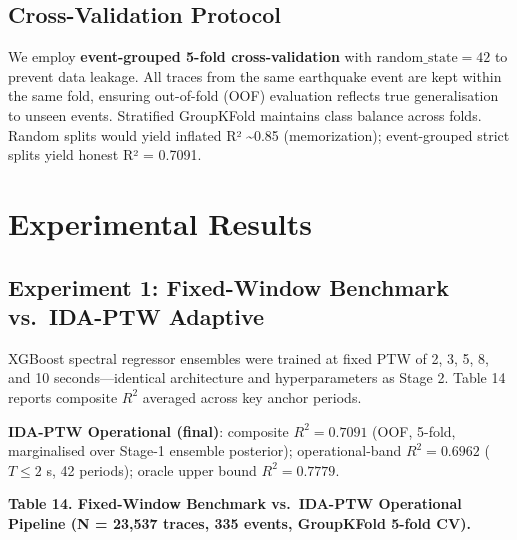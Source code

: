 \documentclass[10pt]{article}
\begin{document}
\subsection{Cross-Validation Protocol}

We employ \textbf{event-grouped 5-fold cross-validation} with $\mathrm{random\_state} = 42$ to prevent data leakage. All traces from the same earthquake event are kept within the same fold, ensuring out-of-fold (OOF) evaluation reflects true generalisation to unseen events. Stratified GroupKFold maintains class balance across folds. Random splits would yield inflated R² \textasciitilde0.85 (memorization); event-grouped strict splits yield honest R² = 0.7091.

\section{Experimental Results}

\subsection{Experiment 1: Fixed-Window Benchmark vs.~IDA-PTW Adaptive}

XGBoost spectral regressor ensembles were trained at fixed PTW of 2, 3, 5, 8, and 10 seconds---identical architecture and hyperparameters as Stage 2. Table 14 reports composite \(R^2\) averaged across key anchor periods.

\textbf{IDA-PTW Operational (final)}: composite \(R^2 = 0.7091\) (OOF, 5-fold, marginalised over Stage-1 ensemble posterior); operational-band \(R^2 = 0.6962\) (\(T \leq 2\) s, 42 periods); oracle upper bound \(R^2 = 0.7779\).

\par\vspace{16pt}\noindent\begingroup\centering\fontsize{8}{10}\selectfont\textbf{Table 14. Fixed-Window Benchmark vs.~IDA-PTW Operational Pipeline (N = 23,537 traces, 335 events, GroupKFold 5-fold CV).}\par\endgroup\vspace{6pt}
\end{document}
